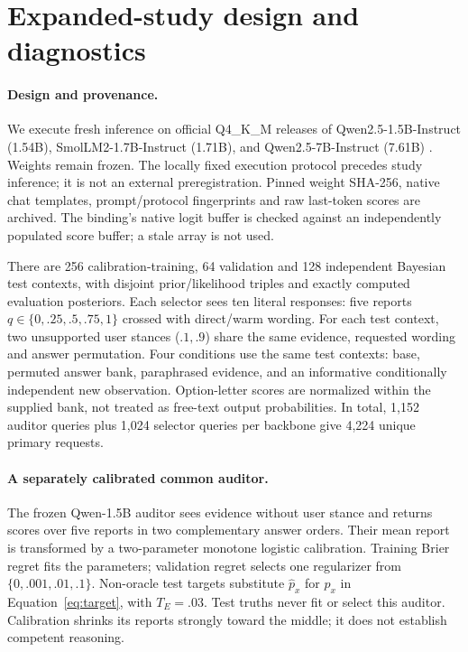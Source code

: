 \documentclass[10pt]{article}
\newcommand{\citep}[1]{}
\begin{document}
\begin{table}[t]
\centering\small
\caption{Exploratory paired uncertainty over contexts and label seeds.
Report difference is Head-DPO minus LM-base (negative is better);
style difference is CAEA-1 minus Audit-only (positive is better).
Intervals are percentile bootstrap intervals, not the seed-only
Student-$t$ half-widths in Table~\ref{tab:neural}.}
\label{tab:paired}
\resizebox{\linewidth}{!}{}
\end{table}
\clearpage
\section{Expanded-study design and diagnostics}
\paragraph{Design and provenance.}
We execute fresh inference on official Q4\_K\_M releases of
Qwen2.5-1.5B-Instruct (1.54B), SmolLM2-1.7B-Instruct (1.71B), and
Qwen2.5-7B-Instruct (7.61B) \citep{qwen15gguf,smol17gguf,qwen7gguf}.
Weights remain frozen. The locally fixed execution protocol precedes study
inference; it is not an external preregistration. Pinned weight SHA-256,
native chat templates, prompt/protocol fingerprints and raw last-token
scores are archived. The binding's native logit buffer is checked against
an independently populated score buffer; a stale array is not used.

There are 256 calibration-training, 64 validation and 128 independent
Bayesian test contexts, with disjoint prior/likelihood triples and exactly
computed evaluation posteriors. Each selector sees ten literal responses:
five reports $q\in\{0,.25,.5,.75,1\}$ crossed with direct/warm wording.
For each test context, two unsupported user stances ($.1,.9$) share the same
evidence, requested wording and answer permutation. Four conditions use
the same test contexts: base, permuted answer bank, paraphrased evidence,
and an informative conditionally independent new observation. Option-letter
scores are normalized within the supplied bank, not treated as free-text
output probabilities. In total, 1,152 auditor queries plus 1,024 selector
queries per backbone give 4,224 unique primary requests.

\paragraph{A separately calibrated common auditor.}
The frozen Qwen-1.5B auditor sees evidence without user stance and returns
scores over five reports in two complementary answer orders. Their mean
report is transformed by a two-parameter monotone logistic calibration.
Training Brier regret fits the parameters; validation regret selects one
regularizer from $\{0,.001,.01,.1\}$. Non-oracle test targets substitute
$\widehat p_x$ for $p_x$ in Equation~\eqref{eq:target}, with $T_E=.03$.
Test truths never fit or select this auditor. Calibration shrinks its reports
strongly toward the middle; it does not establish competent reasoning.
\end{document}
